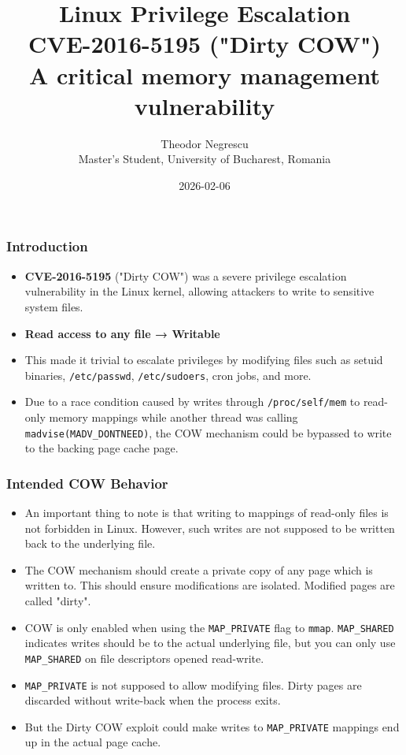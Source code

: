 \documentclass{beamer}
\title{Linux Privilege Escalation\\CVE-2016-5195 ("Dirty COW")\\A critical memory management vulnerability}
\author{
    Theodor Negrescu\\
    \footnotesize Master's Student, University of Bucharest, Romania
}
\date{2026-02-06}
\newcommand{\code}[1]{\texttt{#1}}
\begin{document}
\frame{\titlepage}

\begin{frame}
\frametitle{Introduction}
\begin{itemize}

\item
\textbf{CVE-2016-5195} ("Dirty COW") was a severe privilege escalation vulnerability in the Linux kernel,
allowing attackers to write to sensitive system files.

\item
\textbf{Read access to any file → Writable}

\item
This made it trivial to escalate privileges by modifying files such as setuid binaries, \code{/etc/passwd}, \code{/etc/sudoers}, cron jobs, and more.

\item
Due to a race condition caused by writes through \code{/proc/self/mem} to read-only memory mappings
while another thread was calling \code{madvise(MADV\_DONTNEED)},
the COW mechanism could be bypassed to write to the backing page cache page.

\end{itemize}
\end{frame}

\begin{frame}
\frametitle{Intended COW Behavior}
\begin{itemize}

\item
An important thing to note is that writing to mappings of read-only files is not
forbidden in Linux. However, such writes are not supposed to be written back to the underlying file.

\item
The COW mechanism should create a private copy of any page which is written to.
This should ensure modifications are isolated.
Modified pages are called "dirty".

\item
COW is only enabled when using the \code{MAP\_PRIVATE} flag to \code{mmap}.
\code{MAP\_SHARED} indicates writes should be to the actual underlying file,
but you can only use \code{MAP\_SHARED} on file descriptors opened read-write.

\item
\code{MAP\_PRIVATE} is not supposed to allow modifying files. Dirty pages are discarded without write-back when the process exits.

\item
But the Dirty COW exploit could make writes to \code{MAP\_PRIVATE} mappings end up in the actual page cache.

\end{itemize}
\end{frame}
\end{document}
